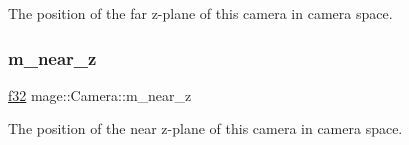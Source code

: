 The position of the far z-\/plane of this camera in camera space. \hypertarget{classmage_1_1_camera_adda0ecc45cf0bab9e0039c0a72b298e3}{}\label{classmage_1_1_camera_adda0ecc45cf0bab9e0039c0a72b298e3} 
\subsubsection{\texorpdfstring{m\+\_\+near\+\_\+z}{m\_near\_z}}
{\footnotesize\ttfamily \hyperlink{namespacemage_a6a44ad388483959dc4dff9f2aef91431}{f32} mage\+::\+Camera\+::m\+\_\+near\+\_\+z\hspace{0.3cm}{\ttfamily [private]}}

The position of the near z-\/plane of this camera in camera space. 